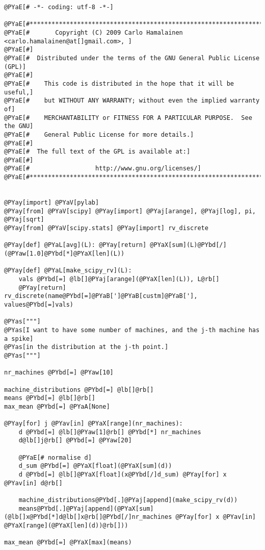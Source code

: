 \begin{Verbatim}[commandchars=@\[\]]
@PYaE[# -*- coding: utf-8 -*-]

@PYaE[#*****************************************************************************]
@PYaE[#       Copyright (C) 2009 Carlo Hamalainen <carlo.hamalainen@at[]gmail.com>, ]
@PYaE[#]
@PYaE[#  Distributed under the terms of the GNU General Public License (GPL)]
@PYaE[#]
@PYaE[#    This code is distributed in the hope that it will be useful,]
@PYaE[#    but WITHOUT ANY WARRANTY; without even the implied warranty of]
@PYaE[#    MERCHANTABILITY or FITNESS FOR A PARTICULAR PURPOSE.  See the GNU]
@PYaE[#    General Public License for more details.]
@PYaE[#]
@PYaE[#  The full text of the GPL is available at:]
@PYaE[#]
@PYaE[#                  http://www.gnu.org/licenses/]
@PYaE[#*****************************************************************************]


@PYay[import] @PYaV[pylab]
@PYay[from] @PYaV[scipy] @PYay[import] @PYaj[arange], @PYaj[log], pi, @PYaj[sqrt]
@PYay[from] @PYaV[scipy.stats] @PYay[import] rv_discrete

@PYay[def] @PYaL[avg](L): @PYay[return] @PYaX[sum](L)@PYbd[/](@PYaw[1.0]@PYbd[*]@PYaX[len](L))

@PYay[def] @PYaL[make_scipy_rv](L):
    vals @PYbd[=] @lb[]@PYaj[arange](@PYaX[len](L)), L@rb[]
    @PYay[return] rv_discrete(name@PYbd[=]@PYaB[']@PYaB[custm]@PYaB['], values@PYbd[=]vals)

@PYas["""]
@PYas[I want to have some number of machines, and the j-th machine has a spike]
@PYas[in the distribution at the j-th point.]
@PYas["""]

nr_machines @PYbd[=] @PYaw[10]

machine_distributions @PYbd[=] @lb[]@rb[]
means @PYbd[=] @lb[]@rb[]
max_mean @PYbd[=] @PYaA[None]

@PYay[for] j @PYav[in] @PYaX[range](nr_machines):
    d @PYbd[=] @lb[]@PYaw[1]@rb[] @PYbd[*] nr_machines
    d@lb[]j@rb[] @PYbd[=] @PYaw[20]
   
    @PYaE[# normalise d]
    d_sum @PYbd[=] @PYaX[float](@PYaX[sum](d))
    d @PYbd[=] @lb[]@PYaX[float](x@PYbd[/]d_sum) @PYay[for] x @PYav[in] d@rb[]

    machine_distributions@PYbd[.]@PYaj[append](make_scipy_rv(d))
    means@PYbd[.]@PYaj[append](@PYaX[sum](@lb[]x@PYbd[*]d@lb[]x@rb[]@PYbd[/]nr_machines @PYay[for] x @PYav[in] @PYaX[range](@PYaX[len](d))@rb[]))

max_mean @PYbd[=] @PYaX[max](means)
       

\end{Verbatim}
